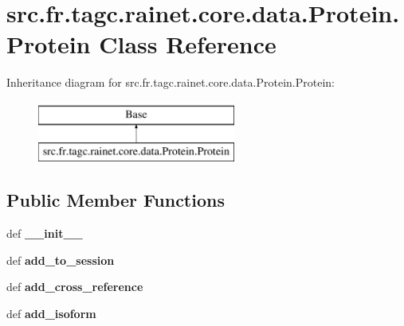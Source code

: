 \hypertarget{classsrc_1_1fr_1_1tagc_1_1rainet_1_1core_1_1data_1_1Protein_1_1Protein}{\section{src.\-fr.\-tagc.\-rainet.\-core.\-data.\-Protein.\-Protein Class Reference}
\label{classsrc_1_1fr_1_1tagc_1_1rainet_1_1core_1_1data_1_1Protein_1_1Protein}
}
Inheritance diagram for src.\-fr.\-tagc.\-rainet.\-core.\-data.\-Protein.\-Protein\-:\begin{figure}[H]
\begin{center}
\leavevmode
\includegraphics[height=2.000000cm]{classsrc_1_1fr_1_1tagc_1_1rainet_1_1core_1_1data_1_1Protein_1_1Protein}
\end{center}
\end{figure}
\subsection*{Public Member Functions}
\begin{DoxyCompactItemize}
\item 
\hypertarget{classsrc_1_1fr_1_1tagc_1_1rainet_1_1core_1_1data_1_1Protein_1_1Protein_aa1dc7bd3671f70ad188086e245fc292f}{def {\bfseries \-\_\-\-\_\-init\-\_\-\-\_\-}}\label{classsrc_1_1fr_1_1tagc_1_1rainet_1_1core_1_1data_1_1Protein_1_1Protein_aa1dc7bd3671f70ad188086e245fc292f}

\item 
\hypertarget{classsrc_1_1fr_1_1tagc_1_1rainet_1_1core_1_1data_1_1Protein_1_1Protein_aac12555c11188d70d614b0a3733838ad}{def {\bfseries add\-\_\-to\-\_\-session}}\label{classsrc_1_1fr_1_1tagc_1_1rainet_1_1core_1_1data_1_1Protein_1_1Protein_aac12555c11188d70d614b0a3733838ad}

\item 
\hypertarget{classsrc_1_1fr_1_1tagc_1_1rainet_1_1core_1_1data_1_1Protein_1_1Protein_a910c6d244a7b6e172f07356d42a9c0cb}{def {\bfseries add\-\_\-cross\-\_\-reference}}\label{classsrc_1_1fr_1_1tagc_1_1rainet_1_1core_1_1data_1_1Protein_1_1Protein_a910c6d244a7b6e172f07356d42a9c0cb}

\item 
\hypertarget{classsrc_1_1fr_1_1tagc_1_1rainet_1_1core_1_1data_1_1Protein_1_1Protein_af31e3b09c970bdb02da317dbba4bb32d}{def {\bfseries add\-\_\-isoform}}\label{classsrc_1_1fr_1_1tagc_1_1rainet_1_1core_1_1data_1_1Protein_1_1Protein_af31e3b09c970bdb02da317dbba4bb32d}

\end{DoxyCompactItemize}
